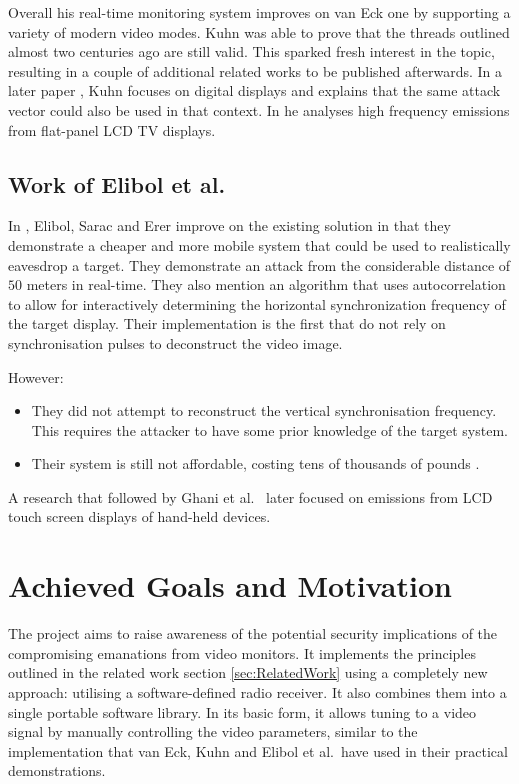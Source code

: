 \documentclass[a4paper,12pt,twoside,openright]{report}
\begin{document}
Overall his real-time monitoring system improves on van Eck one by supporting a variety of modern video modes. Kuhn was able to prove that the threads outlined almost two centuries ago are still valid. This sparked fresh interest in the topic, resulting in a couple of additional related works to be published afterwards. In a later paper \cite{kuhn2005electromagnetic}, Kuhn focuses on digital displays and explains that the same attack vector could also be used in that context. In \cite{kuhn2011compromising} he analyses high frequency emissions from flat-panel LCD TV displays.

\subsection{Work of Elibol et al.}

In \cite{elibol2012realistic}, Elibol, Sarac and Erer improve on the existing solution in that they demonstrate a cheaper and more mobile system that could be used to realistically eavesdrop a target. They demonstrate an attack from the considerable distance of $50$ meters in real-time. They also mention an algorithm that uses autocorrelation to allow for interactively determining the horizontal synchronization frequency of the target display. Their implementation is the first that do not rely on synchronisation pulses to deconstruct the video image.

However:

\begin{itemize}

  \item They did not attempt to reconstruct the vertical synchronisation frequency. This requires the attacker to have some prior knowledge of the target system.
  \item Their system is still not affordable, costing tens of thousands of pounds \cite{nipxi5665}.

\end{itemize}

A research that followed by Ghani et al.\ \cite{ghani2013radiated} later focused on emissions from LCD touch screen displays of hand-held devices.

\section{Achieved Goals and Motivation}

The project aims to raise awareness of the potential security implications of the compromising emanations from video monitors. It implements the principles outlined in the related work section \ref{sec:RelatedWork} using a completely new approach: utilising a software-defined radio receiver. It also combines them into a single portable software library. In its basic form, it allows tuning to a video signal by manually controlling the video parameters, similar to the implementation that van Eck, Kuhn and Elibol et al.\ have used in their practical demonstrations.
\end{document}
